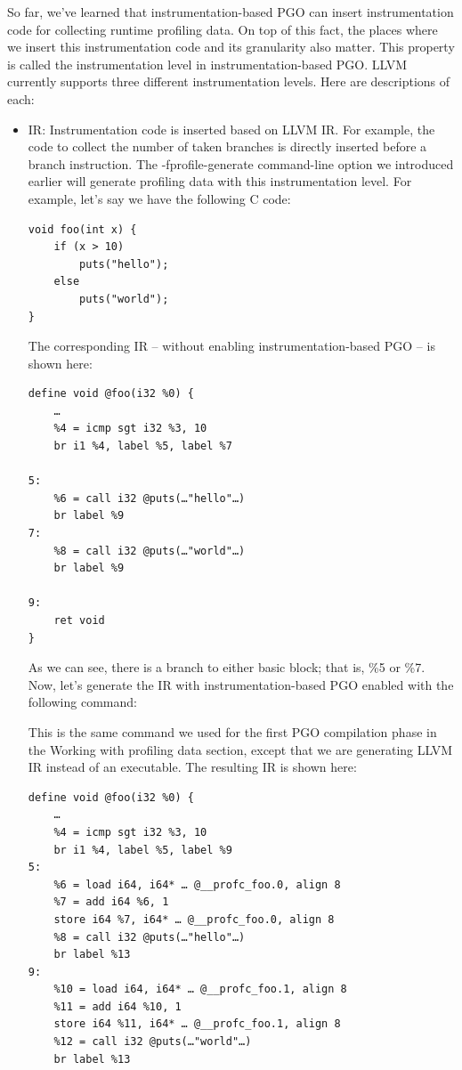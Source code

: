 So far, we've learned that instrumentation-based PGO can insert instrumentation code for collecting runtime profiling data. On top of this fact, the places where we insert this instrumentation code and its granularity also matter. This property is called the instrumentation level in instrumentation-based PGO. LLVM currently supports three different instrumentation levels. Here are descriptions of each:

\begin{itemize}
\item IR: Instrumentation code is inserted based on LLVM IR. For example, the code to collect the number of taken branches is directly inserted before a branch
instruction. The -fprofile-generate command-line option we introduced earlier will generate profiling data with this instrumentation level. For example, let's say we have the following C code:

\begin{lstlisting}[style=styleCXX]
void foo(int x) {
	if (x > 10)
		puts("hello");
	else
		puts("world");
}
\end{lstlisting}

The corresponding IR – without enabling instrumentation-based PGO – is shown here:

\begin{lstlisting}[style=styleCXX]
define void @foo(i32 %0) {
	…
	%4 = icmp sgt i32 %3, 10
	br i1 %4, label %5, label %7
	
5:
	%6 = call i32 @puts(…"hello"…)
	br label %9
7:
	%8 = call i32 @puts(…"world"…)
	br label %9
	
9:
	ret void
}
\end{lstlisting}

As we can see, there is a branch to either basic block; that is, \%5 or \%7. Now, let's generate the IR with instrumentation-based PGO enabled with the following command:


This is the same command we used for the first PGO compilation phase in the Working with profiling data section, except that we are generating LLVM IR instead of an executable. The resulting IR is shown here:

\begin{lstlisting}[style=styleCXX]
define void @foo(i32 %0) {
	…
	%4 = icmp sgt i32 %3, 10
	br i1 %4, label %5, label %9
5:
	%6 = load i64, i64* … @__profc_foo.0, align 8
	%7 = add i64 %6, 1
	store i64 %7, i64* … @__profc_foo.0, align 8
	%8 = call i32 @puts(…"hello"…)
	br label %13
9:
	%10 = load i64, i64* … @__profc_foo.1, align 8
	%11 = add i64 %10, 1
	store i64 %11, i64* … @__profc_foo.1, align 8
	%12 = call i32 @puts(…"world"…)
	br label %13
	

\end{lstlisting}
\end{itemize}
